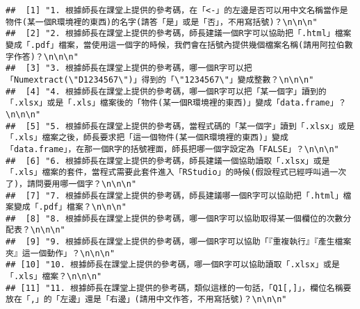 \documentclass[
]{article}
\author{}
\date{\vspace{-2.5em}}
\begin{document}
\begin{verbatim}
##  [1] "1. 根據師長在課堂上提供的參考碼，在「<-」的左邊是否可以用中文名稱當作是物件(某一個R環境裡的東西)的名字(請答「是」或是「否」，不用寫括號)？\n\n\n"                                                                                        
##  [2] "2. 根據師長在課堂上提供的參考碼，師長建議一個R字可以協助把「.html」檔案變成「.pdf」檔案，當使用這一個字的時候，我們會在括號內提供幾個檔案名稱(請用阿拉伯數字作答)？\n\n\n"                                                               
##  [3] "3. 根據師長在課堂上提供的參考碼，哪一個R字可以把「Numextract(\"D1234567\")」得到的「\"1234567\"」變成整數？\n\n\n"                                                                                                                       
##  [4] "4. 根據師長在課堂上提供的參考碼，哪一個R字可以把「某一個字」讀到的「.xlsx」或是「.xls」檔案後的「物件(某一個R環境裡的東西)」變成「data.frame」？\n\n\n"                                                                                  
##  [5] "5. 根據師長在課堂上提供的參考碼，當程式碼的「某一個字」讀到「.xlsx」或是「.xls」檔案之後，師長要求把「這一個物件(某一個R環境裡的東西)」變成「data.frame」，在那一個R字的括號裡面，師長把哪一個字設定為「FALSE」？\n\n\n"                 
##  [6] "6. 根據師長在課堂上提供的參考碼，師長建議一個協助讀取「.xlsx」或是「.xls」檔案的套件，當程式需要此套件進入「RStudio」的時候(假設程式已經呼叫過一次了)，請問要用哪一個字？\n\n\n"                                                         
##  [7] "7. 根據師長在課堂上提供的參考碼，師長建議哪一個R字可以協助把「.html」檔案變成「.pdf」檔案？\n\n\n"                                                                                                                                       
##  [8] "8. 根據師長在課堂上提供的參考碼，哪一個R字可以協助取得某一個欄位的次數分配表？\n\n\n"                                                                                                                                                    
##  [9] "9. 根據師長在課堂上提供的參考碼，哪一個R字可以協助「『重複執行』『產生檔案夾』這一個動作」？\n\n\n"                                                                                                                                      
## [10] "10. 根據師長在課堂上提供的參考碼，哪一個R字可以協助讀取「.xlsx」或是「.xls」檔案？\n\n\n"                                                                                                                                                
## [11] "11. 根據師長在課堂上提供的參考碼，類似這樣的一句話，「Q1[,]」，欄位名稱要放在「,」的「左邊」還是「右邊」(請用中文作答，不用寫括號)？\n\n\n"                                                                                              

\end{verbatim}
\end{document}
